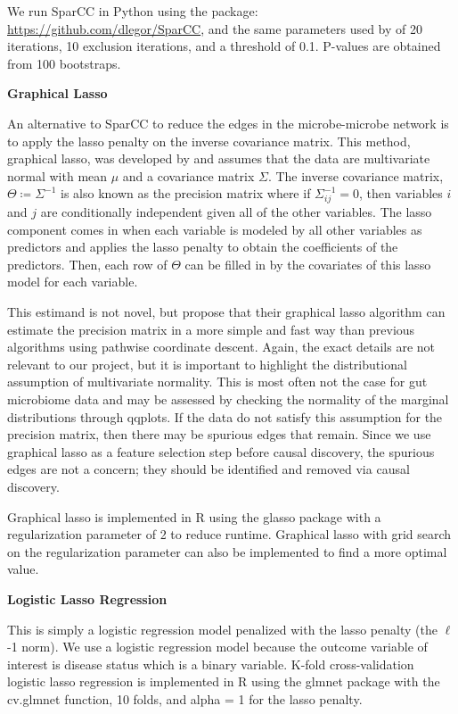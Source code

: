 \documentclass[12pt,letterpaper]{article}
\begin{document}
We run SparCC in Python using the package: \url{https://github.com/dlegor/SparCC}, and the same parameters used by \citep{friedman2012sparcc, zhou2019t2d} of 20 iterations, 10 exclusion iterations, and a threshold of 0.1. P-values are obtained from 100 bootstraps. \newline

\textbf{Graphical Lasso}

An alternative to SparCC to reduce the edges in the microbe-microbe network is to apply the lasso penalty on the inverse covariance matrix. This method, graphical lasso, was developed by \citep{friedman2008glasso} and assumes that the data are multivariate normal with mean $\mu$ and a covariance matrix $\Sigma$. The inverse covariance matrix, $\Theta \coloneq \Sigma^{-1}$ is also known as the precision matrix where if $\Sigma_{ij}^{-1} = 0$, then variables $i$ and $j$ are conditionally independent given all of the other variables. The lasso component comes in when each variable is modeled by all other variables as predictors and applies the lasso penalty to obtain the coefficients of the predictors. Then, each row of $\Theta$ can be filled in by the covariates of this lasso model for each variable. 

This estimand is not novel, but \citep{friedman2008glasso} propose that their graphical lasso algorithm can estimate the precision matrix in a more simple and fast way than previous algorithms using pathwise coordinate descent. Again, the exact details are not relevant to our project, but it is important to highlight the distributional assumption of multivariate normality. This is most often not the case for gut microbiome data and may be assessed by checking the normality of the marginal distributions through qqplots. If the data do not satisfy this assumption for the precision matrix, then there may be spurious edges that remain. Since we use graphical lasso as a feature selection step before causal discovery, the spurious edges are not a concern; they should be identified and removed via causal discovery.

Graphical lasso is implemented in R using the glasso package with a regularization parameter of 2 to reduce runtime. Graphical lasso with grid search on the regularization parameter can also be implemented to find a more optimal value. \newline

\textbf{Logistic Lasso Regression}

This is simply a logistic regression model penalized with the lasso penalty (the $\ell$-1 norm). We use a logistic regression model because the outcome variable of interest is disease status which is a binary variable. K-fold cross-validation logistic lasso regression is implemented in R using the glmnet package with the cv.glmnet function, 10 folds, and alpha = 1 for the lasso penalty.
\end{document}
